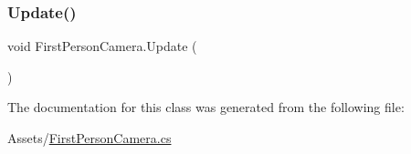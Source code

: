 \subsubsection{\texorpdfstring{Update()}{Update()}}
{\footnotesize\ttfamily void First\+Person\+Camera.\+Update (\begin{DoxyParamCaption}{ }\end{DoxyParamCaption})\hspace{0.3cm}{\ttfamily [private]}}



The documentation for this class was generated from the following file\+:\begin{DoxyCompactItemize}
\item 
Assets/\hyperlink{_first_person_camera_8cs}{First\+Person\+Camera.\+cs}\end{DoxyCompactItemize}
